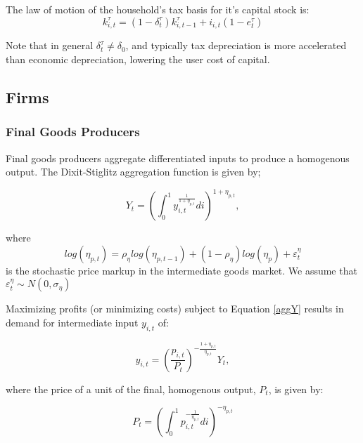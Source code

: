 \documentclass[article,11pt,letterpaper,fleqn]{article}
\theoremstyle{definition}
\numberwithin{equation}{section}
\begin{document}
The law of motion of the household's tax basis for it's capital stock is:
\begin{equation}
\label{LOM_tax_capital}
k_{i,t}^{\tau}=(1-\delta_{t}^{\tau})k_{i,t-1}^{\tau} + i_{i,t}(1-e_{t}^{\tau})
\end{equation}

Note that in general $\delta^{\tau}_{t}\neq \delta_{0}$, and typically tax depreciation is more accelerated than economic depreciation, lowering the user cost of capital.


\subsection{Firms}

\subsubsection{Final Goods Producers}

Final goods producers aggregate differentiated inputs to produce a homogenous output.  The Dixit-Stiglitz aggregation function is given by;

\begin{equation}
\label{aggY}
Y_{t}=\left(\int_{0}^{1} y_{i,t}^{\frac{1}{1+\eta_{p,t}}}di\right)^{1+\eta_{p,t}},
\end{equation}

\noindent\noindent where 
\begin{equation}
\label{markup_process}
log(\eta_{p,t})=\rho_{\eta}log(\eta_{p,t-1})+(1-\rho_{\eta})log(\eta_{p})+\varepsilon^{\eta}_{t}
\end{equation}
 is the stochastic price markup in the intermediate goods market.  We assume that $\varepsilon^{\eta}_{t}\sim N(0,\sigma_{\eta})$

Maximizing profits (or minimizing costs) subject to Equation \ref{aggY} results in demand for intermediate input $y_{i,t}$ of:

\begin{equation}
y_{i,t}=\left(\frac{p_{i,t}}{P_{t}}\right)^{-\frac{1+\eta_{p,t}}{\eta_{p,t}}}Y_{t} ,
\end{equation}

\noindent\noindent where the price of a unit of the final, homogenous output, $P_{t}$, is given by:

\begin{equation}
P_{t}=\left(\int_{0}^{1}p_{i,t}^{-\frac{1}{\eta_{p,t}}}di\right)^{-\eta_{p,t}}
\end{equation}
\end{document}
